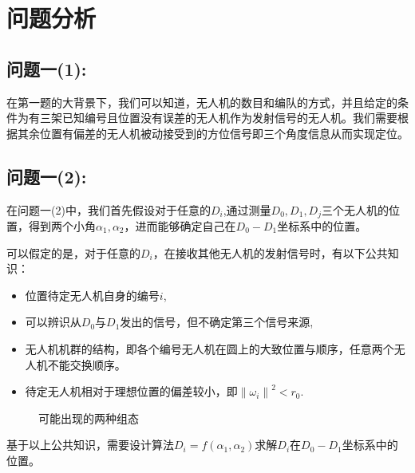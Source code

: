 \documentclass[withoutpreface,bwprint]{cumcmthesis} %
\begin{document}
	\section{问题分析}
		\subsection{问题一(1):}
		在第一题的大背景下，我们可以知道，无人机的数目和编队的方式，并且给定的条件为有三架已知编号且位置没有误差的无人机作为发射信号的无人机。我们需要根据其余位置有偏差的无人机被动接受到的方位信号即三个角度信息从而实现定位。
		\subsection{问题一(2):}
		在问题一(2)中，我们首先假设对于任意的$D_i$,通过测量$D_0,D_1,D_j$三个无人机的位置，得到两个小角$\alpha_1,\alpha_2$，进而能够确定自己在$D_0 - D_1$坐标系中的位置。
		
		可以假定的是，对于任意的$D_i$，在接收其他无人机的发射信号时，有以下公共知识：
		\begin{itemize}
			\item	位置待定无人机自身的编号$i$,
			\item	可以辨识从$D_0$与$D_1$发出的信号，但不确定第三个信号来源,
			\item	无人机机群的结构，即各个编号无人机在圆上的大致位置与顺序，任意两个无人机不能交换顺序。
			\item 	待定无人机相对于理想位置的偏差较小，即$ {\lVert \omega_i \rVert}^2 < r_0 $.
		\end{itemize}
		\begin{figure}[htb]
			\centering
			\caption{可能出现的两种组态}
			\label{fig1}
		\end{figure}
		基于以上公共知识，需要设计算法$D_i = f(\alpha_1, \alpha_2)$求解$D_i$在$D_0 - D_1$坐标系中的位置。
\end{document}
